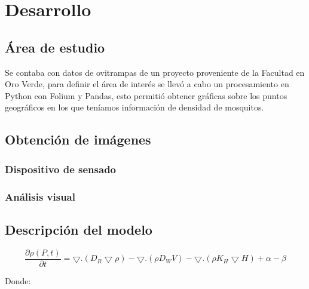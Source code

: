 

\section{Desarrollo}

\subsection{Área de estudio}

Se contaba con datos de ovitrampas de un proyecto proveniente de la Facultad en Oro Verde, para definir el área de interés se llevó a cabo un procesamiento en Python con Folium y Pandas, esto permitió obtener gráficas sobre los puntos geográficos en los que teníamos información de densidad de mosquitos.




\subsection{Obtención de imágenes}

\subsubsection{Dispositivo de sensado}

\subsubsection{Análisis visual}

\subsection{Descripción del modelo}

$$\frac{\partial \rho(P,t)}{\partial t}=\bigtriangledown .(D_R \bigtriangledown \rho)-\bigtriangledown.(\rho D_W V)- \bigtriangledown . (\rho K_H \bigtriangledown H) + \alpha - \beta$$

Donde:

